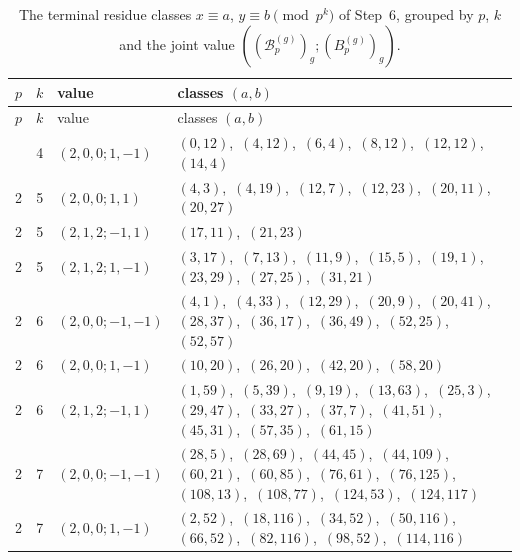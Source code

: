 \documentclass[11pt]{article}
\begin{document}
\begingroup\small
\setlength{\LTcapwidth}{\textwidth}
\begin{longtable}{@{}rrl>{\raggedright\arraybackslash}p{}@{}}
\caption{The terminal residue classes $x\equiv a$, $y\equiv b\pmod{p^k}$ of Step~6, grouped by $p$, $k$ and the joint value $((\mathcal B^{(g)}_p)_g;(B^{(g)}_p)_g)$.}\label{tab:local}\\
\hline $p$ & $k$ & value & classes $(a,b)$\\\hline\endfirsthead
\hline $p$ & $k$ & value & classes $(a,b)$\\\hline\endhead\hline\endfoot
2 & 4 & $(2,0,0;1,-1)$ & $(0,12)$,\allowbreak\ $(4,12)$,\allowbreak\ $(6,4)$,\allowbreak\ $(8,12)$,\allowbreak\ $(12,12)$,\allowbreak\ $(14,4)$\\
2 & 5 & $(2,0,0;1,1)$ & $(4,3)$,\allowbreak\ $(4,19)$,\allowbreak\ $(12,7)$,\allowbreak\ $(12,23)$,\allowbreak\ $(20,11)$,\allowbreak\ $(20,27)$\\
2 & 5 & $(2,1,2;-1,1)$ & $(17,11)$,\allowbreak\ $(21,23)$\\
2 & 5 & $(2,1,2;1,-1)$ & $(3,17)$,\allowbreak\ $(7,13)$,\allowbreak\ $(11,9)$,\allowbreak\ $(15,5)$,\allowbreak\ $(19,1)$,\allowbreak\ $(23,29)$,\allowbreak\ $(27,25)$,\allowbreak\ $(31,21)$\\
2 & 6 & $(2,0,0;-1,-1)$ & $(4,1)$,\allowbreak\ $(4,33)$,\allowbreak\ $(12,29)$,\allowbreak\ $(20,9)$,\allowbreak\ $(20,41)$,\allowbreak\ $(28,37)$,\allowbreak\ $(36,17)$,\allowbreak\ $(36,49)$,\allowbreak\ $(52,25)$,\allowbreak\ $(52,57)$\\
2 & 6 & $(2,0,0;1,-1)$ & $(10,20)$,\allowbreak\ $(26,20)$,\allowbreak\ $(42,20)$,\allowbreak\ $(58,20)$\\
2 & 6 & $(2,1,2;-1,1)$ & $(1,59)$,\allowbreak\ $(5,39)$,\allowbreak\ $(9,19)$,\allowbreak\ $(13,63)$,\allowbreak\ $(25,3)$,\allowbreak\ $(29,47)$,\allowbreak\ $(33,27)$,\allowbreak\ $(37,7)$,\allowbreak\ $(41,51)$,\allowbreak\ $(45,31)$,\allowbreak\ $(57,35)$,\allowbreak\ $(61,15)$\\
2 & 7 & $(2,0,0;-1,-1)$ & $(28,5)$,\allowbreak\ $(28,69)$,\allowbreak\ $(44,45)$,\allowbreak\ $(44,109)$,\allowbreak\ $(60,21)$,\allowbreak\ $(60,85)$,\allowbreak\ $(76,61)$,\allowbreak\ $(76,125)$,\allowbreak\ $(108,13)$,\allowbreak\ $(108,77)$,\allowbreak\ $(124,53)$,\allowbreak\ $(124,117)$\\
2 & 7 & $(2,0,0;1,-1)$ & $(2,52)$,\allowbreak\ $(18,116)$,\allowbreak\ $(34,52)$,\allowbreak\ $(50,116)$,\allowbreak\ $(66,52)$,\allowbreak\ $(82,116)$,\allowbreak\ $(98,52)$,\allowbreak\ $(114,116)$\\

\end{longtable}
\end{document}
